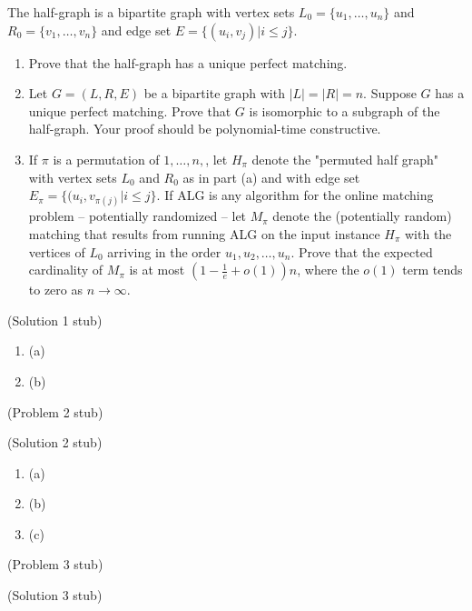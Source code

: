 \documentclass{hmcpset}
\begin{document}
\begin{problem}[1]
The half-graph is a bipartite graph with vertex sets $L_0 = \{u_1,\ldots,u_n\}$ and $R_0 = \{v_1,\ldots,v_n\}$ and edge set $E = \{(u_i, v_j) | i \leq j\}$.
\begin{enumerate}
\item Prove that the half-graph has a unique perfect matching.
\item Let $G = (L,R,E)$ be a bipartite graph with $|L| = |R| = n$. Suppose $G$ has a unique perfect matching. Prove that $G$ is isomorphic to a subgraph of the half-graph. Your proof should be polynomial-time constructive.
\item If $\pi$ is a permutation of ${1,\ldots,n},$, let $H_\pi$ denote the "permuted half graph" with vertex sets $L_0$ and $R_0$ as in part (a) and with edge set $E_\pi = \{(u_i, v_{\pi(j)} | i \leq j\}$. If ALG is any algorithm for the online matching problem -- potentially randomized -- let $M_\pi$ denote the (potentially random) matching that results from running ALG on the input instance $H_\pi$ with the vertices of $L_0$ arriving in the order $u_1, u_2, \ldots, u_n$. Prove that the expected cardinality of $M_\pi$ is at most $(1-\frac{1}{e} + o(1))n$, where the $o(1)$ term tends to zero as $n\rightarrow \infty$.
\end{enumerate}
\end{problem}
\begin{solution}
(Solution 1 stub)
\begin{enumerate}
\item (a)
\item (b)
\end{enumerate}
\end{solution}
\begin{problem}[2]
(Problem 2 stub)
\end{problem}
\begin{solution}
(Solution 2 stub)
\begin{enumerate}
\item (a)
\item (b)
\item (c)
\end{enumerate}
\end{solution}
\begin{problem}[3]
(Problem 3 stub)
\end{problem}
\begin{solution}
(Solution 3 stub)
\end{solution}
\end{document}
